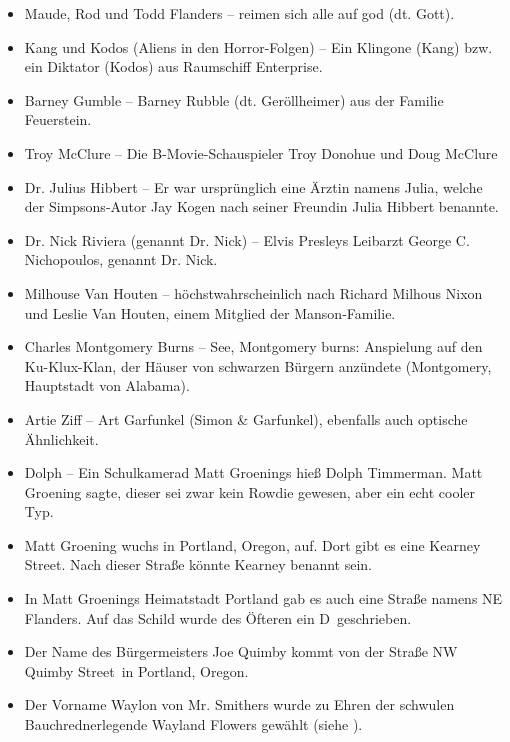 \begin{itemize}
  \item Maude, Rod und Todd Flanders -- reimen sich alle auf god (dt. Gott).
  \item Kang und Kodos (Aliens in den Horror-Folgen) -- Ein Klingone (Kang) bzw. ein Diktator (Kodos) aus Raumschiff Enterprise.
  \item Barney Gumble -- Barney Rubble (dt. Ge\-röll\-hei\-mer) aus der Familie Feuerstein.
  \item Troy McClure -- Die B-Movie-Schauspieler Troy Donohue und Doug McClure
  \item Dr. Julius Hibbert -- Er war ursprünglich eine Ärztin namens Julia, welche der Simpsons-Autor Jay Kogen nach seiner Freundin Julia Hibbert benannte.
  \item Dr. Nick Riviera (genannt Dr. Nick) -- Elvis Presleys Leibarzt George C. Nichopoulos, genannt Dr. Nick.
  \item Milhouse Van Houten -- höchst\-wahr\-schein\-lich nach Richard Milhous Nixon und Leslie Van Houten, einem Mitglied der \glqq Manson\grqq -Familie.
  \item Charles Montgomery Burns -- \glqq See, Montgomery burns\grqq : Anspielung auf den Ku-Klux-Klan, der Häuser von schwarzen Bürgern anzündete (Montgomery, Hauptstadt von Alabama).
  \item Artie Ziff -- Art Garfunkel (Simon \& Garfunkel), ebenfalls auch optische Ähnlichkeit.
  \item Dolph -- Ein Schulkamerad Matt Groenings hieß Dolph Timmerman. Matt Groening sagte, dieser sei zwar kein Rowdie gewesen, aber ein \glqq echt cooler Typ\grqq .
  \item Matt Groening wuchs in Portland, Oregon, auf. Dort gibt es eine \glqq Kearney Street\grqq . Nach dieser Straße könnte Kearney benannt sein.
  \item In Matt Groenings Heimatstadt Portland gab es auch eine Straße namens \glqq NE Flanders\grqq . Auf das Schild wurde des Öfteren ein \glqq D\grqq\ geschrieben.
  \item Der Name des Bürgermeisters Joe Quimby kommt von der Straße \glqq NW Quimby Street\grqq\ in Portland, Oregon.
  \item Der Vorname Waylon von Mr. Smithers wurde zu Ehren der schwulen Bauchrednerlegende Wayland Flowers gewählt (siehe \cite{Reiss19}).
\end{itemize}